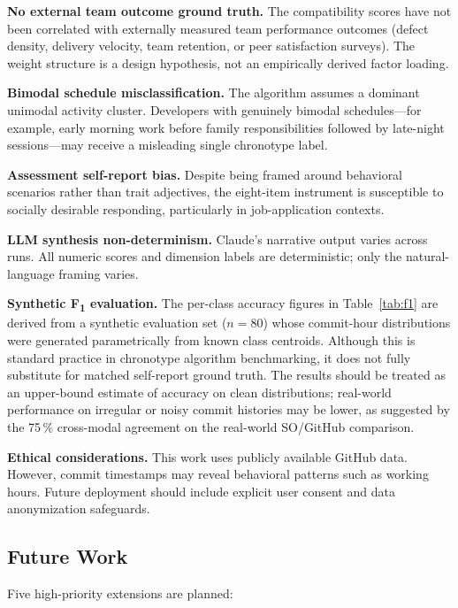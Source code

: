 \documentclass[conference]{IEEEtran}
\begin{document}
\textbf{No external team outcome ground truth.}  The compatibility
scores have not been correlated with externally measured team
performance outcomes (defect density, delivery velocity, team
retention, or peer satisfaction surveys).  The weight structure
is a design hypothesis, not an empirically derived factor loading.

\textbf{Bimodal schedule misclassification.}  The algorithm assumes
a dominant unimodal activity cluster.  Developers with genuinely
bimodal schedules---for example, early morning work before family
responsibilities followed by late-night sessions---may receive a
misleading single chronotype label.

\textbf{Assessment self-report bias.}  Despite being framed around
behavioral scenarios rather than trait adjectives, the eight-item
instrument is susceptible to socially desirable responding,
particularly in job-application contexts.

\textbf{LLM synthesis non-determinism.}  Claude's narrative output
varies across runs.  All numeric scores and dimension labels are
deterministic; only the natural-language framing varies.

\textbf{Synthetic F\textsubscript{1} evaluation.}  The per-class
accuracy figures in Table~\ref{tab:f1} are derived from a
synthetic evaluation set ($n{=}80$) whose commit-hour distributions
were generated parametrically from known class centroids.  Although
this is standard practice in chronotype algorithm benchmarking, it
does not fully substitute for matched self-report ground truth.
The results should be treated as an upper-bound estimate of
accuracy on clean distributions; real-world performance on
irregular or noisy commit histories may be lower, as suggested by
the 75\,\% cross-modal agreement on the real-world SO/GitHub
comparison.

\textbf{Ethical considerations.}  This work uses publicly available
GitHub data.  However, commit timestamps may reveal behavioral
patterns such as working hours.  Future deployment should include
explicit user consent and data anonymization safeguards.

\subsection{Future Work}

Five high-priority extensions are planned:
\end{document}
